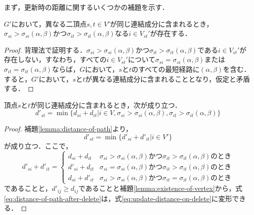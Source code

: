 まず，更新時の距離に関するいくつかの補題を示す．
\begin{lemma}
  \label{lemma:existence-of-vertex}
  $G'$において，異なる二頂点$s,t\in V'$が同じ連結成分に含まれるとき，$\sigma_{si}>\sigma_{si}(\alpha,\beta)$かつ$\sigma_{it}>\sigma_{it}(\alpha,\beta)$なる$i\in V_{st}'$が存在する．
\end{lemma}
\begin{proof}
  背理法で証明する．$\sigma_{si}>\sigma_{si}(\alpha,\beta)$かつ$\sigma_{it}>\sigma_{it}(\alpha,\beta)$である$i\in V_{st}'$が存在しない，すなわち，すべての$i\in V_{st}'$について$\sigma_{si}=\sigma_{si}(\alpha,\beta)$または$\sigma_{it}=\sigma_{it}(\alpha,\beta)$ならば，$G$において，$s$と$t$のすべての最短経路に$(\alpha,\beta)$を含む．すると，$G'$において，$s$と$t$が異なる連結成分に含まれることとなり，仮定と矛盾する．
\end{proof}

\begin{lemma}
  \label{lemma:update-distance-on-delete}
  頂点$s$と$t$が同じ連結成分に含まれるとき，次が成り立つ．
  \begin{equation}
    d'_{st}=\min\{d_{si}+d_{it}|i\in V,\sigma_{si}>\sigma_{si}(\alpha,\beta),\sigma_{it}>\sigma_{it}(\alpha,\beta)\}
    \label{eq:update-distance-on-delete}
  \end{equation}
\end{lemma}
\begin{proof}
  補題\ref{lemma:distance-of-path}より，
  \begin{equation}
    d'_{st}=\min\{d'_{si}+d'_{it}|i\in V'\}
    \label{eq:distance-of-path-after-delete}
  \end{equation}
  が成り立つ．ここで，
  \begin{equation*}
    d'_{si}+d'_{it}=
    \begin{cases}
      d_{si}+d_{it} & \sigma_{si}>\sigma_{si}(\alpha,\beta)\textrm{かつ}\sigma_{it}>\sigma_{it}(\alpha,\beta)のとき \\
      d'_{si}+d_{it} & \sigma_{si}=\sigma_{si}(\alpha,\beta)\textrm{かつ}\sigma_{it}>\sigma_{it}(\alpha,\beta)のとき \\
      d_{si}+d'_{it} & \sigma_{si}>\sigma_{si}(\alpha,\beta)\textrm{かつ}\sigma_{it}=\sigma_{it}(\alpha,\beta)のとき
    \end{cases}
  \end{equation*}
  であることと，$d'_{ij}\geq d_{ij}$であることと補題\ref{lemma:existence-of-vertex}から，式\eqref{eq:distance-of-path-after-delete}は，式\eqref{eq:update-distance-on-delete}に変形できる．
\end{proof}

